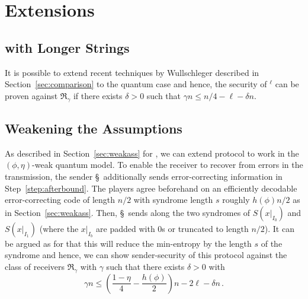 \section{Extensions}
\subsection{\lStringOT with Longer Strings}
It is possible to extend recent techniques by Wullschleger
\cite{Wullschleger07} described in Section~\ref{sec:comparison} to the
quantum case and hence, the security of \Randqot$^{\ell}$ can be
proven against $\mathfrak{R_\gamma}$ if there exists $\delta>0$ such
that $\gamma n \leq n/4 - \ell -\delta n$.

\subsection{Weakening the Assumptions} \label{sec:weakmodel12ot}
As described in Section~\ref{sec:weakass} for \RabinOT, we can extend
protocol \Randqot to work in the $(\phi,\eta)$-weak quantum model.
  To enable the
receiver to recover from errors in the transmission, the sender \S\ 
additionally sends error-correcting information in
Step~\ref{step:afterbound}. The players agree beforehand on an
efficiently decodable error-correcting code of length $n/2$ with
syndrome length $s$ roughly $h(\phi)n/2$ as in
Section~\ref{sec:weakass}. Then, \S\ sends along the two syndromes of
$S(x|_{I_0})$ and $S(x|_{I_1})$ (where the $x|_{I_b}$ are padded with
0s or truncated to length $n/2$). It can be argued as for \RabinOT
that this will reduce the min-entropy by the length $s$ of the
syndrome and hence, we can show 
 sender-security
 of this protocol
against the class of receivers $\mathfrak{R_\gamma}$ with $\gamma$
such that there exists $\delta >0$ with
\[ \gamma n \leq \left( \frac{1-\eta}{4} - \frac{h(\phi)}{2} \right)n - 2 \ell -
\delta n \, .
\]



